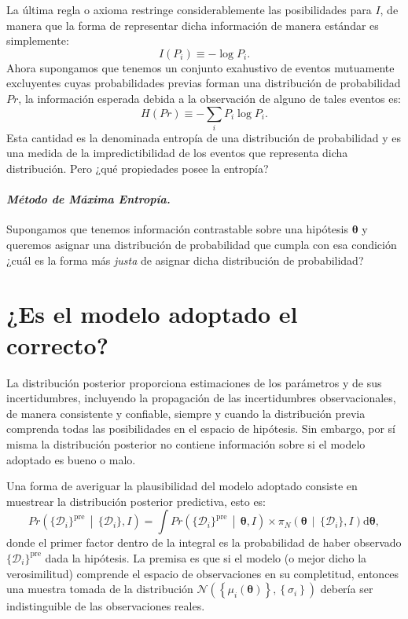 \documentclass[a4paper,twoside]{article}
\newcommand{\hip}{\ensuremath{\mathbold{\theta}}\xspace}
\newcommand{\dat}{\ensuremath{\{\mathcal{D}_i\}}\xspace}
\newcommand{\pos}[2]{\ensuremath{\pi_N\left(#1\,\middle|\, #2\right)}\xspace}
\newcommand{\pro}[2]{\ensuremath{Pr\left(#1\,\middle|\, #2\right)}\xspace}
\newcommand{\set}[1]{\ensuremath{\left\{#1\right\}}\xspace}
\begin{document}
La última regla o axioma restringe considerablemente las posibilidades para $I$, de manera que la
forma de representar dicha información de manera estándar es simplemente:
%
$$I(P_i) \equiv -\log{P_i}.$$
%
Ahora supongamos que tenemos un conjunto exahustivo de eventos mutuamente excluyentes cuyas
probabilidades previas forman una distribución de probabilidad $Pr$, la información esperada debida
a la observación de alguno de tales eventos es:
%
$$H(Pr) \equiv -\sum_i P_i\log{P_i}.$$
%
Esta cantidad es la denominada entropía de una distribución de probabilidad y es una medida de la
impredictibilidad de los eventos que representa dicha distribución. Pero ¿qué propiedades posee la
entropía?

\paragraph{\textit{\color{teal}Método de Máxima Entropía.}} Supongamos que tenemos información
contrastable sobre una hipótesis $\hip$ y queremos asignar una distribución de probabilidad que
cumpla con esa condición ¿cuál es la forma más \emph{justa} de asignar dicha distribución de
probabilidad?


\section{¿Es el modelo adoptado el correcto?}

La distribución posterior proporciona estimaciones de los parámetros y de sus incertidumbres,
incluyendo la propagación de las incertidumbres observacionales, de manera consistente y confiable,
siempre y cuando la distribución previa comprenda todas las posibilidades en el espacio de
hipótesis. Sin embargo, por sí misma la distribución posterior no contiene información sobre si el
modelo adoptado es bueno o malo.

Una forma de averiguar la plausibilidad del modelo adoptado consiste en muestrear la distribución
posterior predictiva, esto es:
%
\begin{equation}
\pro{\dat^\text{pre}}{\dat,I} = \int\pro{\dat^\text{pre}}{\hip,I}\times\pos{\hip}{\dat,I}\text{d}\hip,
\end{equation}
%
donde el primer factor dentro de la integral es la probabilidad de haber observado
$\dat^\text{pre}$ dada la hipótesis. La premisa es que si el modelo (o mejor dicho la
verosimilitud) comprende el espacio de observaciones en su completitud, entonces una muestra tomada
de la distribución $\mathcal{N}(\set{\mu_i(\hip)},\set{\sigma_i})$ debería ser indistinguible de
las observaciones reales.
\end{document}
